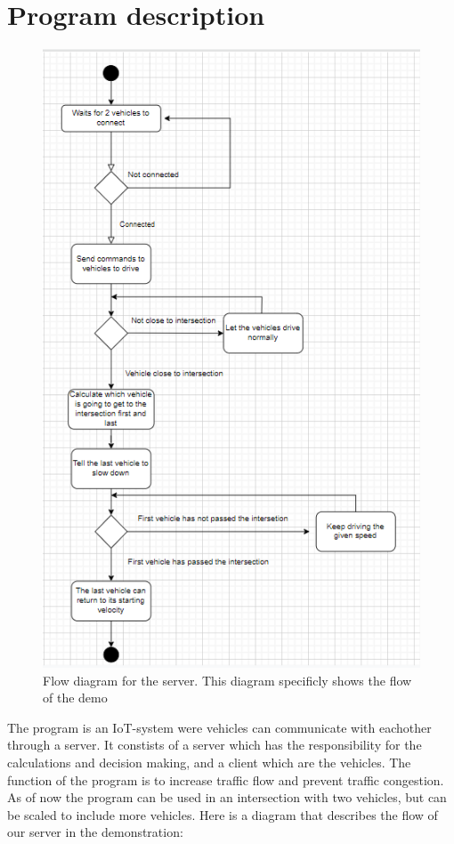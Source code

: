 \section{Program description}

\begin{figure}[h!]
	\centering
	\includegraphics[width=1\linewidth]{figures/Flow_diagram_server}
	\caption[Flow diagram server]{Flow diagram for the server. This diagram specificly shows the flow of the demo}
	\label{fig:diagramserver}
\end{figure}

The program is an IoT-system were vehicles can communicate with eachother through a server. It constists of a server which has the responsibility for the calculations and decision making, and a client which are the vehicles. The function of the program is to increase traffic flow and prevent traffic congestion. As of now the program can be used in an intersection with two vehicles, but can be scaled to include more vehicles. Here is a diagram that describes the flow of our server in the demonstration:



